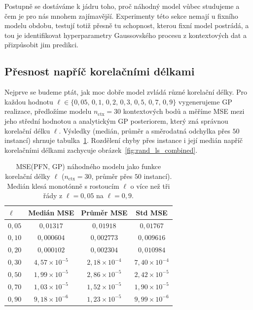 Postupně se dostáváme k jádru toho, proč náhodný model vůbec studujeme a čem je pro nás mnohem zajímavější.
Experimenty této sekce nemají u fixního modelu obdobu, testují totiž přesně tu schopnost, kterou fixní model postrádá, a tou je identifikovat hyperparametry Gaussovského procesu z kontextových dat a přizpůsobit jim predikci.

\subsection{Přesnost napříč korelačními délkami}
\label{subsec:presnost-delky}

Nejprve se budeme ptát, jak moc dobře model zvládá různé korelační délky.
Pro každou hodnotu $\ell \in \{0{,}05,\,\allowbreak 0{,}1,\,\allowbreak 0{,}2,\,\allowbreak 0{,}3,\,\allowbreak 0{,}5,\,\allowbreak 0{,}7,\,\allowbreak 0{,}9\}$ vygenerujeme GP realizace, předložíme modelu $n_{\text{ctx}} = 30$ kontextových bodů a měříme MSE mezi jeho střední hodnotou a analytickým GP posteriorem, který zná správnou korelační délku $\ell$.
Výsledky (medián, průměr a směrodatná odchylka přes $50$ instancí) shrnuje tabulka~\ref{tab:rand_ls}.
Rozdělení chyby přes instance i její medián napříč korelačními délkami zachycuje obrázek~\ref{fig:rand_ls_combined}.
\par

\begin{table}[htbp]
    \centering
    \begin{tabular}{lccc}
    \hline
    $\ell$ & Medián MSE & Průměr MSE & Std MSE \\
    \hline
    $0{,}05$ & $0{,}01317$ & $0{,}01918$ & $0{,}01767$ \\
    $0{,}10$ & $0{,}000604$ & $0{,}002773$ & $0{,}009616$ \\
    $0{,}20$ & $0{,}000102$ & $0{,}002304$ & $0{,}010984$ \\
    $0{,}30$ & $4{,}57 \times 10^{-5}$ & $2{,}18 \times 10^{-4}$ & $7{,}40 \times 10^{-4}$ \\
    $0{,}50$ & $1{,}99 \times 10^{-5}$ & $2{,}86 \times 10^{-5}$ & $2{,}42 \times 10^{-5}$ \\
    $0{,}70$ & $1{,}03 \times 10^{-5}$ & $1{,}52 \times 10^{-5}$ & $1{,}90 \times 10^{-5}$ \\
    $0{,}90$ & $9{,}18 \times 10^{-6}$ & $1{,}23 \times 10^{-5}$ & $9{,}99 \times 10^{-6}$ \\
    \hline
    \end{tabular}
    \caption{MSE(PFN, GP) náhodného modelu jako funkce korelační délky $\ell$ ($n_{\text{ctx}} = 30$, průměr přes $50$ instancí). Medián klesá monotónně s rostoucím $\ell$ o více než tři řády z $\ell = 0{,}05$ na $\ell = 0{,}9$.}
    \label{tab:rand_ls}
\end{table}

